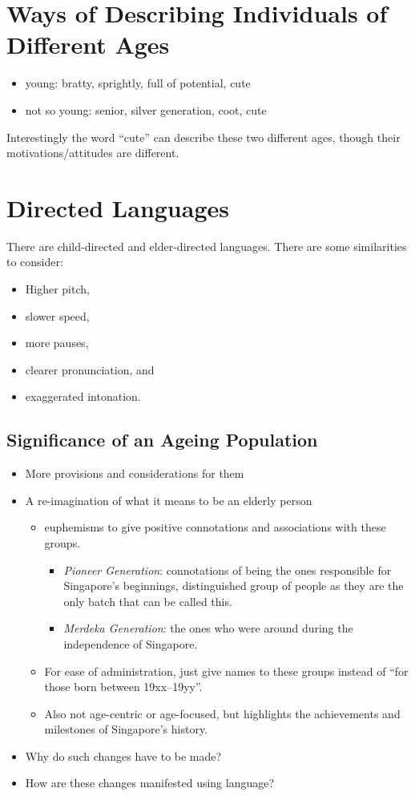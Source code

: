 \documentclass[../main.tex]{subfiles}
\begin{document}
\section{Ways of Describing Individuals of Different Ages}
\begin{itemize}
	\item young: bratty, sprightly, full of potential, cute
	\item not so young: senior, silver generation, coot, cute
\end{itemize}

Interestingly the word ``cute'' can describe these two different ages, though their motivations/attitudes are different.

\section{Directed Languages}
There are child-directed and elder-directed languages. There are some similarities to consider:
\begin{itemize}
	\item Higher pitch,
	\item slower speed,
	\item more pauses,
	\item clearer pronunciation, and
	\item exaggerated intonation.
\end{itemize}

\subsection{Significance of an Ageing Population}
\begin{itemize}
	\item More provisions and considerations for them
	\item A re-imagination of what it means to be an elderly person \begin{itemize}
		\item euphemisms to give positive connotations and associations with these groups. \begin{itemize}
			\item \textit{Pioneer Generation}: connotations of being the ones responsible for Singapore's beginnings, distinguished group of people as they are the only batch that can be called this.
			\item \textit{Merdeka Generation}: the ones who were around during the independence of Singapore.
	\end{itemize}
		\item For ease of administration, just give names to these groups instead of ``for those born between 19xx--19yy''.
		\item Also not age-centric or age-focused, but highlights the achievements and milestones of Singapore's history.
	\end{itemize}
	\item Why do such changes have to be made?
	\item How are these changes manifested using language?
\end{itemize}
\end{document}
